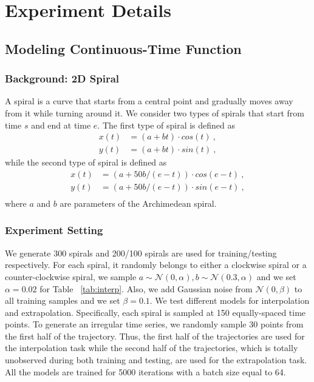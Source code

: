 \section{Experiment Details}

\subsection{Modeling Continuous-Time Function} \label{sec:interpolate}

\subsubsection{Background: 2D Spiral}

A spiral is a curve that starts from a central point and gradually moves away from it while turning around it. We consider two types of spirals that start from time $s$ and end at time $e$. The first type of spiral is defined as
\begin{equation}
    \begin{aligned}
        x(t) & = (a + bt) \cdot cos(t) ~,\\
        y(t) & = (a + bt) \cdot sin(t) ~,
    \end{aligned}
\end{equation}
while the second type of spiral is defined as
\begin{equation}
    \begin{aligned}
        x(t) & = \left(a + 50b / \left(e-t\right)\right) \cdot cos(e-t) ~,\\
        y(t) & = \left(a + 50b / \left(e-t\right)\right) \cdot sin(e-t) ~,\\
    \end{aligned}
\end{equation}
where $a$ and $b$ are parameters of the Archimedean spiral.

\subsubsection{Experiment Setting}

We generate 300 spirals and 200/100 spirals are used for training/testing respectively. For each spiral, it randomly belongs to either a clockwise spiral or a counter-clockwise spiral, we sample $a \sim \mathcal{N}(0, \alpha), b \sim \mathcal{N}(0.3, \alpha)$ and we set $\alpha=0.02$ for Table ~\ref{tab:interp}. Also, we add Gaussian noise from $\mathcal{N}(0, \beta)$ to all training samples and we set $\beta=0.1$. We test different models for interpolation and extrapolation. Specifically, each spiral is sampled at 150 equally-spaced time points. To generate an irregular time series, we randomly sample 30 points from the first half of the trajectory. Thus, the first half of the trajectories are used for the interpolation task while the second half of the trajectories, which is totally unobserved during both training and testing, are used for the extrapolation task. All the models are trained for 5000 iterations with a batch size equal to 64.

